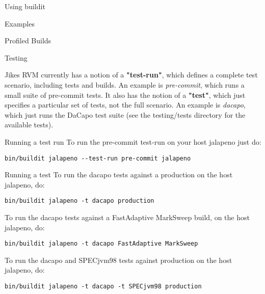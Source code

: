 \begin{section}{Using buildit}
\begin{subsection}{Examples}
\begin{subsubsection}{Profiled Builds}
\end{subsubsection}

\begin{subsubsection}{Testing}

Jikes RVM currently has a notion of a \textbf{"test-run"}, which defines a complete test scenario, including tests and builds.  An example is \textit{pre-commit}, which runs a small suite of pre-commit tests.  It also has the notion of a \textbf{"test"}, which just specifies a particular set of tests, not the full scenario.  An example is \textit{dacapo}, which just runs the DaCapo test suite (see the testing/tests directory for the available tests).

\end{subsubsection}

\begin{subsubsection}{Running a test run}
To run the pre-commit test-run on your host jalapeno just do:

\begin{lstlisting}
bin/buildit jalapeno --test-run pre-commit jalapeno
\end{lstlisting}

\end{subsubsection}

\begin{subsubsection}{Running a test}
To run the dacapo tests against a production on the host jalapeno, do:

\begin{lstlisting}
bin/buildit jalapeno -t dacapo production
\end{lstlisting}

To run the dacapo tests against a FastAdaptive MarkSweep build, on the host jalapeno, do:

\begin{lstlisting}
bin/buildit jalapeno -t dacapo FastAdaptive MarkSweep
\end{lstlisting}

To run the dacapo and SPECjvm98 tests against production on the host jalapeno, do:

\begin{lstlisting}
bin/buildit jalapeno -t dacapo -t SPECjvm98 production
\end{lstlisting}

\end{subsubsection}

\end{subsection}

\end{section}